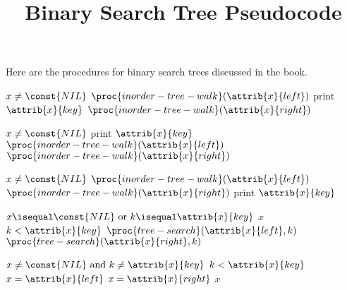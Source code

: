 \documentclass[12pt]{article}
\title{Binary Search Tree Pseudocode}
\author{}
\date{}
\begin{document}
\maketitle

Here are the procedures for binary search trees discussed in the book.

\begin{codebox}
\li \If $x \neq \const{NIL}$
\li \Then
        $\proc{inorder-tree-walk}(\attrib{x}{left})$
\li     print $\attrib{x}{key}$
\li     $\proc{inorder-tree-walk}(\attrib{x}{right})$
\end{codebox}

\begin{codebox}
\li \If $x \neq \const{NIL}$
\li \Then
        print $\attrib{x}{key}$
\li     $\proc{inorder-tree-walk}(\attrib{x}{left})$
\li     $\proc{inorder-tree-walk}(\attrib{x}{right})$
\end{codebox}

\begin{codebox}
\li \If $x \neq \const{NIL}$
\li \Then
        $\proc{inorder-tree-walk}(\attrib{x}{left})$
\li     $\proc{inorder-tree-walk}(\attrib{x}{right})$
\li     print $\attrib{x}{key}$
\end{codebox}

\begin{codebox}
\li \If $x \isequal \const{NIL} \text{ or } k \isequal \attrib{x}{key}$
\li \Then
        \Return $x$
    \End
\li \If $k < \attrib{x}{key}$ 
\li \Then
        \Return $\proc{tree-search}(\attrib{x}{left}, k)$
\li \Else
\li     \Return $\proc{tree-search}(\attrib{x}{right}, k)$
    \End
\end{codebox}

\begin{codebox}
\li \While $x \neq \const{NIL} \text{ and } k \neq \attrib{x}{key}$
    \Do
\li     \If $k < \attrib{x}{key}$ 
        \Then
\li         $x = \attrib{x}{left}$
\li     \Else
\li         $x = \attrib{x}{right}$ 
        \End
    \End
\li \Return $x$
\end{codebox}
\end{document}
